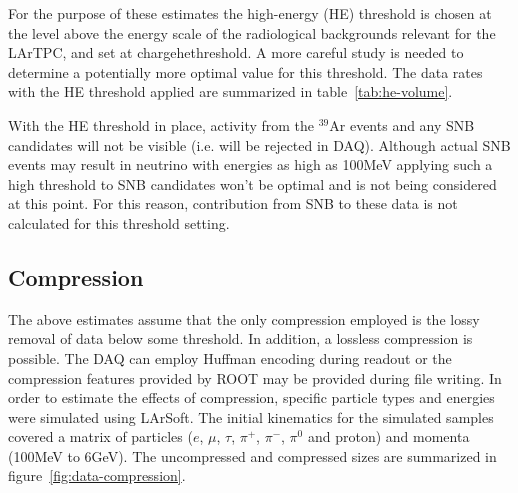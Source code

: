 For the purpose of these estimates the  high-energy (HE) threshold is chosen at the level above 
the energy scale of the radiological backgrounds relevant for the LArTPC, and set at  chargehethreshold.
A more careful study is needed to determine a potentially more optimal value for this threshold.
The data rates with the HE threshold applied are summarized in table~\ref{tab:he-volume}.

%

With the HE threshold in place, activity from the $^{39}$Ar events and any SNB
candidates will not be visible (i.e. will be rejected in DAQ).
Although actual SNB events may result in neutrino with energies as high as
100MeV applying such a high threshold to SNB candidates won't be optimal and is not being considered at this point.
For this reason, contribution from SNB to these data is not calculated for this threshold setting.


\subsection{Compression}

The above estimates assume that the only compression employed is the
lossy removal of data below some threshold.
In addition, a lossless compression is possible.
The DAQ can employ Huffman encoding during readout or the compression
features provided by ROOT may be provided during file writing.
In order to estimate the effects of compression, specific particle
types and energies were simulated using LArSoft.
The initial kinematics for the simulated samples covered a matrix of
particles ($e$, $\mu$, $\tau$, $\pi^+$, $\pi^-$, $\pi^0$ and proton) and momenta
(100MeV to 6GeV).
The uncompressed and compressed sizes are summarized in figure~\ref{fig:data-compression}.




